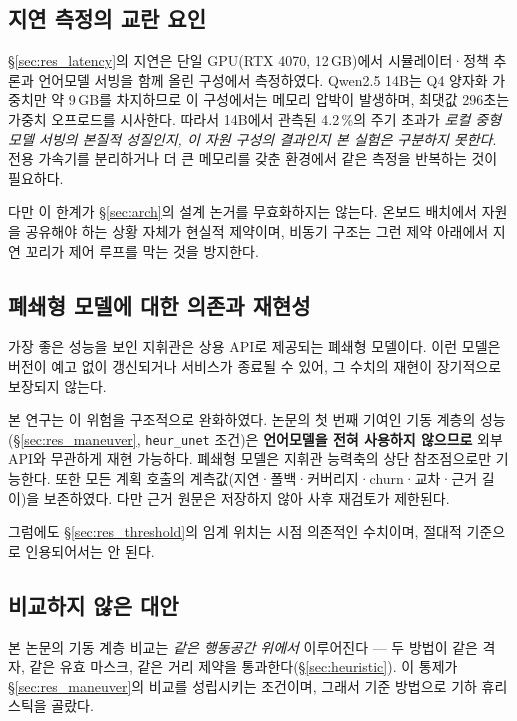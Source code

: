 \subsection{지연 측정의 교란 요인}

\S\ref{sec:res_latency}의 지연은 단일 GPU(RTX 4070, 12\,GB)에서 시뮬레이터·정책 추론과
언어모델 서빙을 함께 올린 구성에서 측정하였다. Qwen2.5 14B는 Q4 양자화 가중치만 약 9\,GB를
차지하므로 이 구성에서는 메모리 압박이 발생하며, 최댓값 296초는 가중치 오프로드를 시사한다.
따라서 14B에서 관측된 4.2\,\%의 주기 초과가 \emph{로컬 중형 모델 서빙의 본질적 성질인지,
이 자원 구성의 결과인지 본 실험은 구분하지 못한다}. 전용 가속기를 분리하거나 더 큰 메모리를
갖춘 환경에서 같은 측정을 반복하는 것이 필요하다.

다만 이 한계가 \S\ref{sec:arch}의 설계 논거를 무효화하지는 않는다. 온보드 배치에서 자원을
공유해야 하는 상황 자체가 현실적 제약이며, 비동기 구조는 그런 제약 아래에서 지연 꼬리가
제어 루프를 막는 것을 방지한다.

\subsection{폐쇄형 모델에 대한 의존과 재현성}

가장 좋은 성능을 보인 지휘관은 상용 API로 제공되는 폐쇄형 모델이다. 이런 모델은 버전이
예고 없이 갱신되거나 서비스가 종료될 수 있어, 그 수치의 재현이 장기적으로 보장되지 않는다.

본 연구는 이 위험을 구조적으로 완화하였다. 논문의 첫 번째 기여인 기동 계층의 성능
(\S\ref{sec:res_maneuver}, \texttt{heur\_unet} 조건)은 \textbf{언어모델을 전혀 사용하지
않으므로} 외부 API와 무관하게 재현 가능하다. 폐쇄형 모델은 지휘관 능력축의 상단 참조점으로만
기능한다. 또한 모든 계획 호출의 계측값(지연·폴백·커버리지·churn·교차·근거 길이)을 보존하였다. 다만 근거 원문은 저장하지 않아 사후 재검토가 제한된다.

그럼에도 \S\ref{sec:res_threshold}의 임계 위치는 시점 의존적인 수치이며, 절대적 기준으로
인용되어서는 안 된다.

\subsection{비교하지 않은 대안}

본 논문의 기동 계층 비교는 \emph{같은 행동공간 위에서} 이루어진다 --- 두 방법이 같은 격자,
같은 유효 마스크, 같은 거리 제약을 통과한다(\S\ref{sec:heuristic}). 이 통제가
\S\ref{sec:res_maneuver}의 비교를 성립시키는 조건이며, 그래서 기준 방법으로 기하
휴리스틱을 골랐다.

